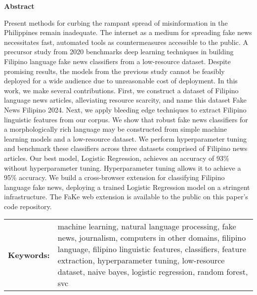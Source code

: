 
\begin{center}
    \textbf{Abstract}
    \end{center}
    \setlength{\parindent}{0pt}
    Present methods for curbing the rampant spread of misinformation in the Philippines remain inadequate. The internet as a medium for spreading fake news necessitates fast, automated tools as countermeasures accessible to the public. A precursor study from 2020 benchmarks deep learning techniques in building Filipino language fake news classifiers from a low-resource dataset. Despite promising results, the models from the previous study cannot be feasibly deployed for a wide audience due to unreasonable cost of deployment. In this work, we make several contributions. First, we construct a dataset of Filipino language news articles, alleviating resource scarcity, and name this dataset Fake News Filipino 2024. Next, we apply bleeding edge techniques to extract Filipino linguistic features from our corpus. We show that robust fake news classifiers for a morphologically rich language may be constructed from simple machine learning models and a low-resource dataset. We perform hyperparameter tuning and benchmark these classifiers across three datasets comprised of Filipino news articles. Our best model, Logistic Regression, achieves an accuracy of 93\% without hyperparameter tuning. Hyperparameter tuning allows it to achieve a 95\% accuracy. We build a cross-browser extension for classifying Filipino language fake news, deploying a trained Logistic Regression model on a stringent infrastructure. The FaKe web extension is available to the public on this paper's code repository.


    \begin{tabular}{lp{4.25in}}
    \hspace{-0.5em}\textbf{Keywords:}\hspace{0.25em} & machine learning, natural language processing, fake news, journalism, computers in other domains, filipino language, filipino linguistic features, classifiers, feature extraction, hyperparameter tuning, low-resource dataset, naive bayes, logistic regression, random forest, svc\\
\end{tabular}

